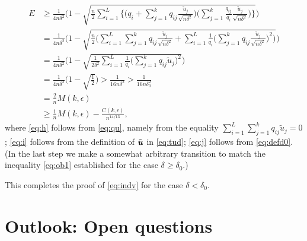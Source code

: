 \documentclass[11pt,onecolumn]{IEEEtran}
\def\mathbi#1{{\textbf{\textit #1}}}
\begin{document}
\begin{align}
E&\ge  \frac{1}{4 n\delta^2} \Biggl(1 - 
\sqrt{\frac{n}{2} \sum_{i=1}^{L}  \Biggl\{
\Big(q_i + \sum_{j=1}^k q_{ij} \frac{\tilde{u}_j}{\sqrt{n\delta^2}} \Big) 
 \Big( \sum_{j=1}^k \frac{q_{ij}}{q_i} \frac{\tilde{u}_j}{\sqrt{n\delta^2}}  \Big)  \Biggr\}  } \Biggr) \nonumber\\
&= \frac{1}{4 n\delta^2} \Biggl(1 - 
\sqrt{\frac{n}{2} \Big( \sum_{i=1}^{L}\sum_{j=1}^k q_{ij} \frac{\tilde{u}_j}{\sqrt{n\delta^2}} 
+  \sum_{i=1}^{L} \frac{1}{q_i} \Big(\sum_{j=1}^k q_{ij} \frac{\tilde{u}_j}{\sqrt{n\delta^2}} \Big)^2  \Big) } \Biggr) \nonumber\\
& = \frac{1}{4 n\delta^2} \Biggl(1 - 
\sqrt{\frac{1}{2\delta^2}   \sum_{i=1}^{L} \frac{1}{q_i} \Big(\sum_{j=1}^k q_{ij} \tilde{u}_j \Big)^2   } \Biggr)
\label{eq:h} \\
&= \frac{1}{4 n\delta^2} \Big(1 - \sqrt{\frac{1}{2}} \Big)
> \frac{1}{16 n\delta^2} > \frac{1}{16 n\delta_0^2} \label{eq:i}\\
&= \frac{2}{n} M(k,\epsilon) \label{eq:j} \\
&{\ge \frac 1n M(k,\epsilon)- \frac{C(k,\epsilon)} {n^{14/13} }}
 , \nonumber
\end{align}
where \eqref{eq:h} follows from \eqref{eq:qu}, namely from the equality 
$\sum_{i=1}^{L}\sum_{j=1}^k q_{ij} \tilde{u}_j   = 0$; \eqref{eq:i} follows from the definition of $\tilde{\mathbi{u}}$ in
\eqref{eq:tud}; \eqref{eq:j}
follows from \eqref{eq:defd0}. (In the last step we make a somewhat arbitrary transition to match the inequality \eqref{eq:ob1} 
established for the case $\delta\ge \delta_0$.)

This completes the proof of \eqref{eq:indv} for the case $\delta < \delta_0$.


\section{Outlook: Open questions}\label{Sect:FW}
\end{document}
